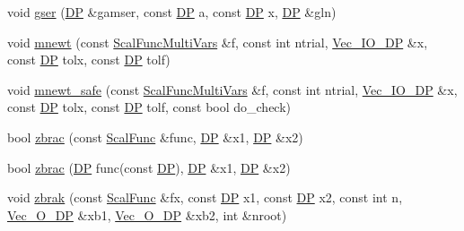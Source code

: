 \begin{DoxyCompactItemize}
\item 
void \mbox{\hyperlink{namespaceNR_acf96c684ec4dc14593c22c45848ad511}{gser}} (\mbox{\hyperlink{namespaceNR_af6ff762dd605ff477b8e52387253a02a}{DP}} \&gamser, const \mbox{\hyperlink{namespaceNR_af6ff762dd605ff477b8e52387253a02a}{DP}} a, const \mbox{\hyperlink{namespaceNR_af6ff762dd605ff477b8e52387253a02a}{DP}} x, \mbox{\hyperlink{namespaceNR_af6ff762dd605ff477b8e52387253a02a}{DP}} \&gln)
\item 
void \mbox{\hyperlink{namespaceNR_a9217e3777ed00b4cd6f83abd69e4cef9}{mnewt}} (const \mbox{\hyperlink{classNR_1_1ScalFuncMultiVars}{Scal\+Func\+Multi\+Vars}} \&f, const int ntrial, \mbox{\hyperlink{namespaceNR_ab293e06a6bf799d8a7ed932b6852bcb8}{Vec\+\_\+\+I\+O\+\_\+\+DP}} \&x, const \mbox{\hyperlink{namespaceNR_af6ff762dd605ff477b8e52387253a02a}{DP}} tolx, const \mbox{\hyperlink{namespaceNR_af6ff762dd605ff477b8e52387253a02a}{DP}} tolf)
\item 
void \mbox{\hyperlink{namespaceNR_a613c01d6d0517310d92cab226cef58bc}{mnewt\+\_\+safe}} (const \mbox{\hyperlink{classNR_1_1ScalFuncMultiVars}{Scal\+Func\+Multi\+Vars}} \&f, const int ntrial, \mbox{\hyperlink{namespaceNR_ab293e06a6bf799d8a7ed932b6852bcb8}{Vec\+\_\+\+I\+O\+\_\+\+DP}} \&x, const \mbox{\hyperlink{namespaceNR_af6ff762dd605ff477b8e52387253a02a}{DP}} tolx, const \mbox{\hyperlink{namespaceNR_af6ff762dd605ff477b8e52387253a02a}{DP}} tolf, const bool do\+\_\+check)
\item 
bool \mbox{\hyperlink{namespaceNR_aec41661a6d34a54e59e37058f380730c}{zbrac}} (const \mbox{\hyperlink{classNR_1_1ScalFunc}{Scal\+Func}} \&func, \mbox{\hyperlink{namespaceNR_af6ff762dd605ff477b8e52387253a02a}{DP}} \&x1, \mbox{\hyperlink{namespaceNR_af6ff762dd605ff477b8e52387253a02a}{DP}} \&x2)
\item 
bool \mbox{\hyperlink{namespaceNR_a4dbd7cac092f614af934413917fc22d4}{zbrac}} (\mbox{\hyperlink{namespaceNR_af6ff762dd605ff477b8e52387253a02a}{DP}} func(const \mbox{\hyperlink{namespaceNR_af6ff762dd605ff477b8e52387253a02a}{DP}}), \mbox{\hyperlink{namespaceNR_af6ff762dd605ff477b8e52387253a02a}{DP}} \&x1, \mbox{\hyperlink{namespaceNR_af6ff762dd605ff477b8e52387253a02a}{DP}} \&x2)
\item 
void \mbox{\hyperlink{namespaceNR_a83128554a5aed28c6d59ecb925577945}{zbrak}} (const \mbox{\hyperlink{classNR_1_1ScalFunc}{Scal\+Func}} \&fx, const \mbox{\hyperlink{namespaceNR_af6ff762dd605ff477b8e52387253a02a}{DP}} x1, const \mbox{\hyperlink{namespaceNR_af6ff762dd605ff477b8e52387253a02a}{DP}} x2, const int n, \mbox{\hyperlink{namespaceNR_a970094d23441f8ef6a45282a7eb2103d}{Vec\+\_\+\+O\+\_\+\+DP}} \&xb1, \mbox{\hyperlink{namespaceNR_a970094d23441f8ef6a45282a7eb2103d}{Vec\+\_\+\+O\+\_\+\+DP}} \&xb2, int \&nroot)

\end{DoxyCompactItemize}
